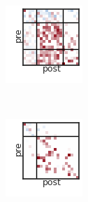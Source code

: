 \begin{figure}[t!]
\begin{subfigure}[b]{1.10in}
  \end{subfigure}
  ~
  \hspace{-.1in}
  \begin{subfigure}[b]{1.10in}
    \centering
    \includegraphics[width=\textwidth]{figures/ch3/SBM-SBM.png}
  \end{subfigure}
  ~
  \hspace{-.1in}
  \begin{subfigure}[b]{1.10in}
    \centering
    \includegraphics[width=\textwidth]{figures/ch3/Distance-SBM.png}

\end{subfigure}
\end{figure}
